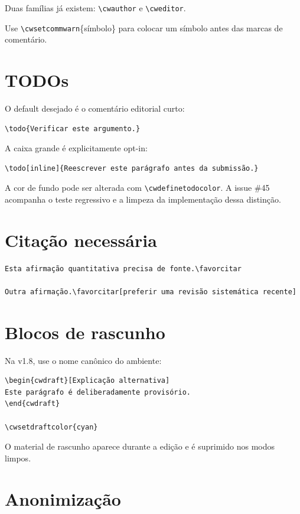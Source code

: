 \documentclass[11pt]{article}
\newcommand{\cmd}[1]{\texttt{\textbackslash#1}}
\begin{document}
Duas famílias já existem: \cmd{cwauthor} e \cmd{cweditor}.

Use \cmd{cwsetcommwarn}\{símbolo\} para colocar um símbolo antes das marcas de comentário.

\section*{TODOs}

O default desejado é o comentário editorial curto:

\begin{verbatim}
\todo{Verificar este argumento.}
\end{verbatim}

A caixa grande é explicitamente opt-in:

\begin{verbatim}
\todo[inline]{Reescrever este parágrafo antes da submissão.}
\end{verbatim}

A cor de fundo pode ser alterada com \cmd{cwdefinetodocolor}. A issue \#45 acompanha o teste regressivo e a limpeza da implementação dessa distinção.

\section*{Citação necessária}

\begin{verbatim}
Esta afirmação quantitativa precisa de fonte.\favorcitar

Outra afirmação.\favorcitar[preferir uma revisão sistemática recente]
\end{verbatim}

\section*{Blocos de rascunho}

Na v1.8, use o nome canônico do ambiente:

\begin{verbatim}
\begin{cwdraft}[Explicação alternativa]
Este parágrafo é deliberadamente provisório.
\end{cwdraft}

\cwsetdraftcolor{cyan}
\end{verbatim}

O material de rascunho aparece durante a edição e é suprimido nos modos limpos.

\section*{Anonimização}
\end{document}
